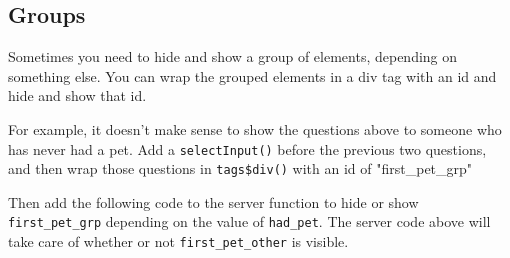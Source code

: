 \documentclass[
  oneside]{book}
\newenvironment{Shaded}{\begin{snugshade}}{\end{snugshade}}
\newcommand{\AttributeTok}[1]{\textcolor[rgb]{0.77,0.63,0.00}{#1}}
\newcommand{\CommentTok}[1]{\textcolor[rgb]{0.56,0.35,0.01}{\textit{#1}}}
\newcommand{\ConstantTok}[1]{\textcolor[rgb]{0.00,0.00,0.00}{#1}}
\newcommand{\ControlFlowTok}[1]{\textcolor[rgb]{0.13,0.29,0.53}{\textbf{#1}}}
\newcommand{\FunctionTok}[1]{\textcolor[rgb]{0.00,0.00,0.00}{#1}}
\newcommand{\NormalTok}[1]{#1}
\newcommand{\SpecialCharTok}[1]{\textcolor[rgb]{0.00,0.00,0.00}{#1}}
\newcommand{\StringTok}[1]{\textcolor[rgb]{0.31,0.60,0.02}{#1}}
\begin{document}
\hypertarget{groups}{%
\subsection{Groups}\label{groups}}

Sometimes you need to hide and show a group of elements, depending on something else. You can wrap the grouped elements in a div tag with an id and hide and show that id.

For example, it doesn't make sense to show the questions above to someone who has never had a pet. Add a \texttt{selectInput}\texttt{()} before the previous two questions, and then wrap those questions in \texttt{tags\$div}\texttt{()} with an id of \StringTok{"first\_pet\_grp"}

\begin{Shaded}
\end{Shaded}

Then add the following code to the server function to hide or show \texttt{first\_pet\_grp} depending on the value of \texttt{had\_pet}. The server code above will take care of whether or not \texttt{first\_pet\_other} is visible.

\begin{Shaded}
\end{Shaded}
\end{document}

